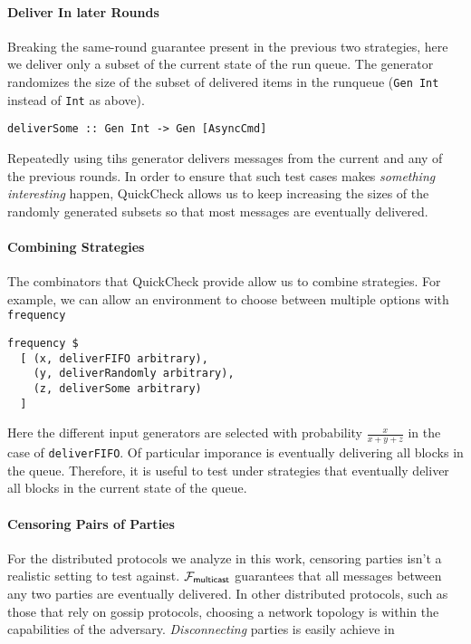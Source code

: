 \paragraph{Deliver In later Rounds}
Breaking the same-round guarantee present in the previous two strategies, here we deliver only a subset of the current state of the run queue.
The generator randomizes the size of the subset of delivered items in the runqueue (\texttt{Gen Int} instead of \texttt{Int} as above).
\begin{lstlisting}
deliverSome :: Gen Int -> Gen [AsyncCmd]
\end{lstlisting}
Repeatedly using tihs generator delivers messages from the current and any of the previous rounds. 
In order to ensure that such test cases makes \emph{something interesting} happen, QuickCheck allows us to keep increasing the sizes of the randomly generated subsets so that
most messages are eventually delivered. 

\paragraph{Combining Strategies}
The combinators that QuickCheck provide allow us to combine strategies.
For example, we can allow an environment to choose between multiple options with \texttt{frequency}
\begin{lstlisting}
frequency $ 
  [ (x, deliverFIFO arbitrary),
  	(y, deliverRandomly arbitrary),
	(z, deliverSome arbitrary)
  ]
\end{lstlisting} 
Here the different input generators are selected with probability $\frac{x}{x+y+z}$ in the case of \texttt{deliverFIFO}.
Of particular imporance is eventually delivering all blocks in the queue. 
Therefore, it is useful to test under strategies that eventually deliver all blocks in the current state of the queue. 

\paragraph{Censoring Pairs of Parties}
For the distributed protocols we analyze in this work, censoring parties isn't a realistic setting to test against.
$\mathcal{F}_{{\mathsf {multicast}}}$ guarantees that all messages between any two parties are eventually delivered.
In other distributed protocols, such as those that rely on gossip protocols, choosing a network topology is within the capabilities of the adversary.
\emph{Disconnecting} parties is easily achieve in \us {}

